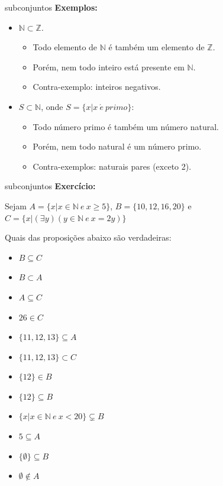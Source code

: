 \documentclass[aspectratio=169]{beamer}
\begin{document}
\begin{frame}{subconjuntos}
    \textbf{Exemplos:}
    \vspace{4mm}

    \begin{itemize}
        \item $\mathbb{N} \subset \mathbb{Z}$.
        \begin{itemize}
            \item Todo elemento de $\mathbb{N}$ é também um elemento de $\mathbb{Z}$.
            \item Porém, nem todo inteiro está presente em $\mathbb{N}$.
            \item Contra-exemplo: inteiros negativos. 
        \end{itemize}

        \item $S \subset \mathbb{N}$, onde $S = \{ x | x ~ \acute{e} ~ primo\}$:
        \begin{itemize}
            \item Todo número primo é também um número natural.
            \item Porém, nem todo natural é um número primo.
            \item Contra-exemplos: naturais pares (exceto 2).
        \end{itemize}
    \end{itemize}
    
\end{frame}

\begin{frame}{subconjuntos}
    \textbf{Exercício:}
    \vspace{4mm}

    Sejam $A = \{x | x \in \mathbb{N} ~ e ~ x \geq 5\}$, $B = \{10, 12, 16, 20\}$ e $C = \{x | (\exists y)(y \in \mathbb{N} ~ e ~ x = 2y)\}$

    Quais das proposições abaixo são verdadeiras:
    
    \begin{multicols}{2}
        \begin{itemize}
            \item $B \subseteq C$
            \item $B \subset A$
            \item $A \subseteq C$
            \item $26 \in C$
            \item $\{11, 12, 13\} \subseteq A$
            \item $\{11, 12, 13\} \subset C$
            \item $\{12\} \in B$
            \item $\{12\} \subseteq B$
            \item $\{x | x \in \mathbb{N} ~ e ~ x < 20\} \subsetneq B$
            \item $5 \subseteq A$
            \item $\{\emptyset\} \subseteq B$
            \item $\emptyset \notin A$
        \end{itemize}
    \end{multicols}
\end{frame}
\end{document}
